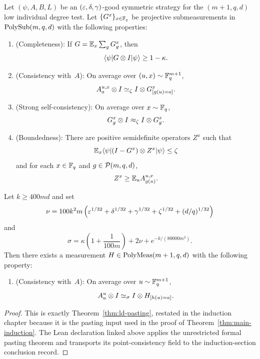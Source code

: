 \begin{theorem}[Pasting]\label{thm:ld-pasting-in-induction-section}
  \leanok
  Let $(\psi,A,B,L)$ be an $(\varepsilon,\delta,\gamma)$-good symmetric strategy for the $(m+1,q,d)$ low individual degree test. Let $\{G^x\}_{x \in \mathbb{F}_q}$ be projective submeasurements in $\mathrm{PolySub}(m,q,d)$ with the following properties:
  \begin{enumerate}
    \item (Completeness): \label{item:ld-pasting-inductive-completeness} If $G=\mathbb{E}_x \sum_g G_g^x$, then
    \[
      \langle \psi \rvert G \otimes I \lvert \psi \rangle \ge 1-\kappa.
    \]
    \item (Consistency with~$A$): \label{item:ld-pasting-inductive-consistency} On average over $(u,x) \sim \mathbb{F}_q^{m+1}$,
    \[
      A_a^{u,x} \otimes I \simeq_\zeta I \otimes G_{[g(u)=a]}^x.
    \]
    \item (Strong self-consistency): \label{item:ld-pasting-inductive-self-consistency} On average over $x \sim \mathbb{F}_q$,
    \[
      G_g^x \otimes I \approx_\zeta I \otimes G_g^x.
    \]
    \item (Boundedness): \label{item:ld-pasting-inductive-boundedness} There are positive semidefinite operators $Z^x$ such that
    \[
      \mathbb{E}_x \langle \psi \rvert (I-G^x) \otimes Z^x \lvert \psi \rangle \le \zeta
    \]
    and for each $x \in \mathbb{F}_q$ and $g \in \mathcal{P}(m,q,d)$,
    \[
      Z^x \ge \mathbb{E}_u A_{g(u)}^{u,x}.
    \]
  \end{enumerate}
  Let $k \ge 400md$ and set
  \[
    \nu = 100k^2m\left(\varepsilon^{1/32}+\delta^{1/32}+\gamma^{1/32}+\zeta^{1/32}+(d/q)^{1/32}\right)
  \]
  and
  \[
    \sigma = \kappa\left(1+\frac{1}{100m}\right) + 2\nu + e^{-k/(80000m^2)}.
  \]
  Then there exists a measurement $H \in \mathrm{PolyMeas}(m+1,q,d)$ with the following property:
  \begin{enumerate}
    \item (Consistency with~$A$): \label{item:ld-pasting-inductive-N-consistency} On average over $u \sim \mathbb{F}_q^{m+1}$,
    \[
      A_a^u \otimes I \simeq_\sigma I \otimes H_{[h(u)=a]}.
    \]
  \end{enumerate}
\end{theorem}
\begin{proof}
	\leanok
	This is exactly Theorem~\ref{thm:ld-pasting}, restated in the induction chapter
	because it is the pasting input used in the proof of
	Theorem~\ref{thm:main-induction}.  The Lean declaration linked above applies
	the unrestricted formal pasting theorem and transports its point-consistency
	field to the induction-section conclusion record.
\end{proof}

